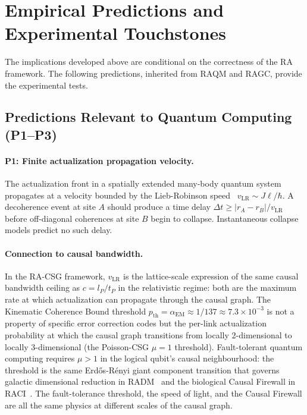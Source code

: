 \documentclass[11pt,a4paper]{article}
\theoremstyle{plain}
\theoremstyle{definition}
\theoremstyle{remark}
\begin{document}
\section{Empirical Predictions and Experimental Touchstones}
\label{sec:predictions}

The implications developed above are conditional on the correctness of the RA
framework. The following predictions, inherited from RAQM and RAGC, provide the
experimental tests.

\subsection{Predictions Relevant to Quantum Computing (P1--P3)}

\paragraph{P1: Finite actualization propagation velocity.}
The actualization front in a spatially extended many-body quantum system propagates
at a velocity bounded by the Lieb-Robinson speed~\citep{LiebRobinson1972}
$v_{\mathrm{LR}} \sim J\ell/\hbar$. A decoherence event at site $A$ should
produce a time delay $\Delta t \geq |r_A - r_B|/v_{\mathrm{LR}}$ before
off-diagonal coherences at site $B$ begin to collapse. Instantaneous collapse
models predict no such delay.

\paragraph{Connection to causal bandwidth.}
In the RA-CSG framework, $v_{\mathrm{LR}}$ is the lattice-scale expression
of the same causal bandwidth ceiling as $c = l_P/t_P$ in the relativistic
regime: both are the maximum rate at which actualization can propagate
through the causal graph. The Kinematic Coherence Bound threshold
$p_{\mathrm{th}} = \alpha_{\mathrm{EM}} \approx 1/137 \approx 7.3\times10^{-3}$ is not a property of specific error
correction codes but the per-link actualization probability at which
the causal graph transitions from locally 2-dimensional to locally
3-dimensional (the Poisson-CSG $\mu = 1$ threshold). Fault-tolerant
quantum computing requires $\mu > 1$ in the logical qubit's causal
neighbourhood: the threshold is the same Erd\H{o}s-R\'{e}nyi giant
component transition that governs galactic dimensional reduction in
RADM~\citep{Sandeman2026RADM} and the biological Causal Firewall
in RACI~\citep{Sandeman2026RACI}. The fault-tolerance threshold,
the speed of light, and the Causal Firewall are all the same
physics at different scales of the causal graph.
\end{document}
